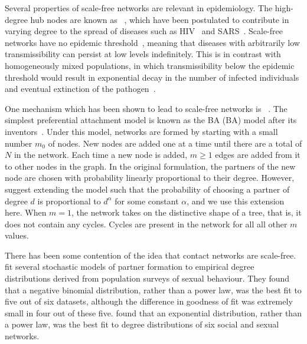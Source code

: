 Several properties of scale-free networks are relevant in epidemiology.  The
high-degree hub nodes are known as
~\autocite{kemper1980identification}, which have been
postulated to contribute in varying degree to the spread of diseases such as
\gls{HIV}~\autocite{stadler2013uncovering} and
\gls{SARS}~\autocite{shen2004superspreading}. Scale-free networks have no
epidemic threshold~\autocite{pastor2001epidemic}, meaning that diseases with
arbitrarily low transmissibility can persist at low levels indefinitely. This
is in contrast with homogeneously mixed populations, in which transmissibility
below the epidemic threshold would result in exponential decay in the number of
infected individuals and eventual extinction of the
pathogen~\autocite{anderson1992infectious}.

One mechanism which has been shown to lead to scale-free networks is
~\autocite{simon1955class,
barabasi1999emergence}. The simplest preferential attachment model is known as
the \acrlong{BA} (BA) model after its
inventors~\autocite{barabasi1999emergence}. Under this model, networks are
formed by starting with a small number $m_0$ of nodes. New nodes are added one
at a time until there are a total of $N$ in the network. Each time a new node
is added, $m \geq 1$ edges are added from it to other nodes in the graph. In
the original formulation, the partners of the new node are chosen with
probability linearly proportional to their degree. However,
\citeauthor{barabasi1999emergence} suggest extending the model such that the
probability of choosing a partner of degree $d$ is proportional to $d^\alpha$
for some constant $\alpha$, and we use this extension here. When $m = 1$, the
network takes on the distinctive shape of a tree, that is, it does not contain
any cycles. Cycles are present in the network for all all other $m$ values.

There has been some contention of the idea that contact networks are
scale-free. \textcite{handcock2004likelihood} fit several stochastic models of
partner formation to empirical degree distributions derived from population
surveys of sexual behaviour. They found that a negative binomial distribution,
rather than a power law, was the best fit to five out of six datasets, although
the difference in goodness of fit was extremely small in four out of these
five. \textcite{bansal2007individual} found that an exponential distribution,
rather than a power law, was the best fit to degree distributions of six social
and sexual networks. 

